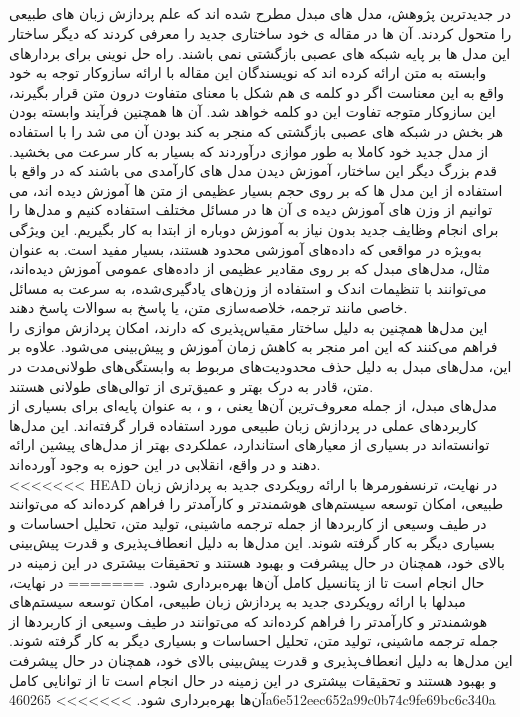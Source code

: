 \subsection{}
در جدیدترین پژوهش، مدل های مبدل مطرح شده اند که علم پردازش زبان های طبیعی را متحول کردند. آن ها در
مقاله ی خود ساختاری جدید را معرفی کردند که دیگر ساختار این مدل ها بر پایه شبکه های عصبی بازگشتی نمی باشند.
راه حل نوینی برای بردارهای وابسته به متن ارائه کرده اند که
نویسندگان این مقاله با ارائه سازوکار توجه به خود
واقع به این معناست اگر دو کلمه ی هم شکل با معنای متفاوت درون متن قرار بگیرند، این سازوکار متوجه تفاوت این دو کلمه
خواهد شد. آن ها همچنین فرآیند وابسته بودن هر بخش در شبکه های عصبی بازگشتی که منجر به کند بودن آن می شد را
با استفاده از مدل جدید خود کاملا به طور موازی درآوردند که بسیار به کار سرعت می بخشید.
قدم بزرگ دیگر این ساختار، آموزش دیدن مدل های کارآمدی می باشند که در واقع با استفاده
از این مدل ها که بر روی حجم بسیار عظیمی از متن ها آموزش دیده اند، می توانیم از وزن های آموزش دیده ی آن ها در مسائل مختلف استفاده کنیم و مدل‌ها را برای انجام وظایف جدید بدون نیاز به آموزش دوباره از ابتدا به کار بگیریم. این ویژگی به‌ویژه در مواقعی که داده‌های آموزشی محدود هستند، بسیار مفید است. به عنوان مثال، مدل‌های مبدل که بر روی مقادیر عظیمی از داده‌های عمومی آموزش دیده‌اند، می‌توانند با تنظیمات اندک و استفاده از وزن‌های یادگیری‌شده، به سرعت به مسائل خاصی مانند ترجمه، خلاصه‌سازی متن، یا پاسخ به سوالات پاسخ دهند.
\\
این مدل‌ها همچنین به دلیل ساختار مقیاس‌پذیری که دارند، امکان پردازش موازی را فراهم می‌کنند که این امر منجر به کاهش زمان آموزش و پیش‌بینی می‌شود. علاوه بر این، مدل‌های مبدل به دلیل حذف محدودیت‌های مربوط به وابستگی‌های طولانی‌مدت در متن، قادر به درک بهتر و عمیق‌تری از توالی‌های طولانی هستند.
\\
مدل‌های مبدل، از جمله معروف‌ترین آن‌ها یعنی ،  و ، به عنوان پایه‌ای برای بسیاری از کاربردهای عملی در پردازش زبان طبیعی مورد استفاده قرار گرفته‌اند. این مدل‌ها توانسته‌اند در بسیاری از معیارهای استاندارد، عملکردی بهتر از مدل‌های پیشین ارائه دهند و در واقع، انقلابی در این حوزه به وجود آورده‌اند.
\\
<<<<<<< HEAD
در نهایت، ترنسفورمرها با ارائه رویکردی جدید به پردازش زبان طبیعی، امکان توسعه سیستم‌های هوشمندتر و کارآمدتر را فراهم کرده‌اند که می‌توانند در طیف وسیعی از کاربردها از جمله ترجمه ماشینی، تولید متن، تحلیل احساسات و بسیاری دیگر به کار گرفته شوند. این مدل‌ها به دلیل انعطاف‌پذیری و قدرت پیش‌بینی بالای خود، همچنان در حال پیشرفت و بهبود هستند و تحقیقات بیشتری در این زمینه در حال انجام است تا از پتانسیل کامل آن‌ها بهره‌برداری شود.
\cite{vaswani2017attention}
=======
در نهایت، مبدلها با ارائه رویکردی جدید به پردازش زبان طبیعی، امکان توسعه سیستم‌های هوشمندتر و کارآمدتر را فراهم کرده‌اند که می‌توانند در طیف وسیعی از کاربردها از جمله ترجمه ماشینی، تولید متن، تحلیل احساسات و بسیاری دیگر به کار گرفته شوند. این مدل‌ها به دلیل انعطاف‌پذیری و قدرت پیش‌بینی بالای خود، همچنان در حال پیشرفت و بهبود هستند و تحقیقات بیشتری در این زمینه در حال انجام است تا از توانایی کامل آن‌ها بهره‌برداری شود.
>>>>>>> 460265a6e512eec652a99c0b74c9fe69bc6c340a

